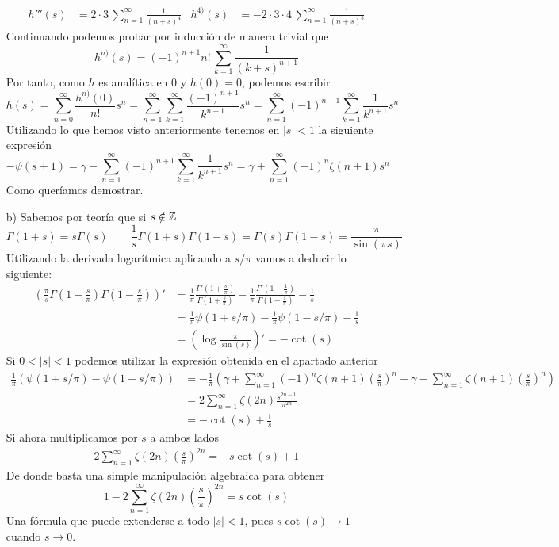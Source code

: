 \documentclass[twoside]{article}
\begin{document}
\begin{sol}
\begin{itemize}
\begin{align*}
h'''(s) &= 2 \cdot 3 \, \sum_{n=1}^\infty\frac{1}{(n+s)^4} &  h^{4)}(s) &= -2 \cdot 3 \cdot 4 \,\sum_{n=1}^\infty\frac{1}{(n+s)^5}
\end{align*}
Continuando podemos probar por inducción de manera trivial que
$$h^{n)}(s) = (-1)^{n+1}n!\,\sum_{k=1}^\infty\frac{1}{(k+s)^{n+1}}$$
Por tanto, como $h$ es analítica en $0$ y $h(0)=0$, podemos escribir
$$
h(s)=\sum_{n=0}^\infty \frac{h^{n)}(0)}{n!}s^n = \sum_{n=1}^\infty\sum_{k=1}^\infty\frac{(-1)^{n+1}}{k^{n+1}}  s^n = \sum_{n=1}^\infty(-1)^{n+1}\sum_{k=1}^\infty\frac{1}{k^{n+1}}  s^n 
$$
Utilizando lo que hemos visto anteriormente tenemos en $|s|<1$ la siguiente expresión
$$
-\psi(s+1) = \gamma -  \sum_{n=1}^\infty(-1)^{n+1}\sum_{k=1}^\infty\frac{1}{k^{n+1}}  s^n = \gamma + \sum_{n=1}^\infty(-1)^{n}\zeta(n+1) s^n
$$
Como queríamos demostrar.
\newpage
\item[b)] Sabemos por teoría que si $s\notin \mathbb{Z}$
$$\Gamma(1+s)=s\Gamma(s)  \qquad \frac{1}{s}\Gamma(1+s)\Gamma(1-s)= 	\Gamma(s)\Gamma(1-s)=\frac{\pi}{\sin(\pi s)} \qquad 
$$
Utilizando la derivada logarítmica aplicando a $s/\pi$ vamos a deducir lo siguiente:
\begin{align*}
\left(\frac{\pi}{s}\Gamma\left(1+\frac{s}{\pi}\right)\Gamma\left(1-\frac{s}{\pi}\right)\right)' & = \frac{1}{\pi}\frac{\Gamma'\left(1+\frac{s}{\pi}\right)}{\Gamma\left(1+\frac{s}{\pi}\right)} - \frac{1}{\pi}\frac{\Gamma'(1-\frac{1}{\pi})}{\Gamma(1-\frac{1}{\pi})} - \frac{1}{s}\\
 &= \frac{1}{\pi}\psi(1+s/\pi)-\frac{1}{\pi}\psi(1-s/\pi) - \frac{1}{s}\\
&=\left(\log\frac{\pi}{\sin(s)}\right)'  = -\cot(s)
\end{align*}
Si $0<|s|<1$ podemos utilizar la expresión obtenida en el apartado anterior
\begin{align*}
\frac{1}{\pi}\left(\psi(1+s/\pi)-\psi(1-s/\pi)\right) &=  -\frac{1}{\pi}\left(\gamma+ \sum_{n=1}^\infty(-1)^{n}\zeta(n+1) \left(\frac{s}{\pi}\right)^n -  \gamma - \sum_{n=1}^\infty\zeta(n+1) \left(\frac{s}{\pi}\right)^n\right)\\
&=2\sum_{n=1}^\infty \zeta(2n)\frac{s^{2n-1}}{\pi^{2n}}\\
&=-\cot(s)+\frac{1}{s}
\end{align*}
Si ahora multiplicamos por $s$ a ambos lados
\begin{gather*}
2\sum_{n=1}^\infty \zeta(2n)\left(\frac{s}{\pi}\right)^{2n}=-s\cot(s)+1 
\end{gather*}
De donde basta una simple manipulación algebraica para obtener
$$
1-2\sum_{n=1}^\infty \zeta(2n)\left(\frac{s}{\pi}\right)^{2n}=s\cot(s)
$$
Una fórmula que puede extenderse a todo $|s|<1$, pues $s\cot(s)\to 1$ cuando $s\to 0$.
\end{itemize}
\end{sol}
\newpage
\end{document}
